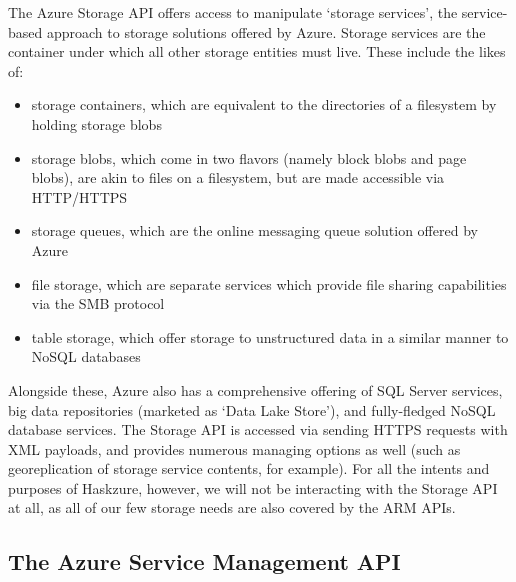 \documentclass[11pt]{report}
\begin{document}
The Azure Storage API offers access to manipulate `storage services', the
service-based approach to storage solutions offered by Azure. Storage services
are the container under which all other storage entities must live.
These include the likes of:
\begin{itemize}
    \item{} storage containers, which are equivalent to the directories of a
        filesystem by holding storage blobs
    \item{} storage blobs, which come in two flavors (namely block blobs and
        page blobs), are akin to files on a filesystem, but are made
        accessible via HTTP/HTTPS
    \item{} storage queues, which are the online messaging queue solution
        offered by Azure
    \item{} file storage, which are separate services which provide file
        sharing capabilities via the SMB protocol
    \item{} table storage, which offer storage to unstructured data in a
        similar manner to NoSQL databases
\end{itemize}
Alongside these, Azure also has a comprehensive offering of SQL Server
services, big data repositories (marketed as `Data Lake Store'), and
fully-fledged NoSQL database services. \newline
The Storage API is accessed via sending HTTPS requests with XML payloads, and
provides numerous managing options as well (such as georeplication of storage
service contents, for example). For all the intents and purposes of Haskzure,
however, we will not be interacting with the Storage API at all, as all of our
few storage needs are also covered by the ARM APIs.

\subsection{The Azure Service Management API}
\end{document}
